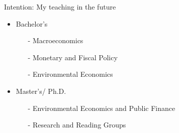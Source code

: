 \begin{frame}{Intention: My teaching in the future}

\begin{itemize}
	\item Bachelor's
	\begin{itemize}
		\item[-] Macroeconomics
		\item[-] Monetary and Fiscal Policy
		\item[-] Environmental Economics 
	\end{itemize}
	\item Master's/ Ph.D.
	\begin{itemize}
		\item[-] Environmental Economics and Public Finance
		\item[-] Research and Reading Groups
	\end{itemize}
\end{itemize}
\end{frame}

